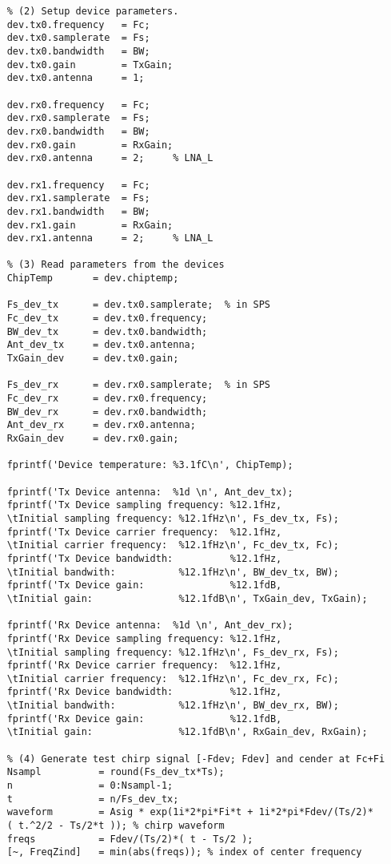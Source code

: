 \begin{verbatim}
    % (2) Setup device parameters. 
    dev.tx0.frequency   = Fc;   
    dev.tx0.samplerate  = Fs;   
    dev.tx0.bandwidth   = BW;
    dev.tx0.gain        = TxGain;
    dev.tx0.antenna     = 1;     
    
    dev.rx0.frequency   = Fc;
    dev.rx0.samplerate  = Fs;
    dev.rx0.bandwidth   = BW;
    dev.rx0.gain        = RxGain;
    dev.rx0.antenna     = 2;     % LNA_L
    
    dev.rx1.frequency   = Fc;
    dev.rx1.samplerate  = Fs;
    dev.rx1.bandwidth   = BW;
    dev.rx1.gain        = RxGain;
    dev.rx1.antenna     = 2;     % LNA_L
    
    % (3) Read parameters from the devices
    ChipTemp       = dev.chiptemp;
    
    Fs_dev_tx      = dev.tx0.samplerate;  % in SPS
    Fc_dev_tx      = dev.tx0.frequency;
    BW_dev_tx      = dev.tx0.bandwidth;
    Ant_dev_tx     = dev.tx0.antenna;
    TxGain_dev     = dev.tx0.gain;
    
    Fs_dev_rx      = dev.rx0.samplerate;  % in SPS
    Fc_dev_rx      = dev.rx0.frequency;
    BW_dev_rx      = dev.rx0.bandwidth;
    Ant_dev_rx     = dev.rx0.antenna;
    RxGain_dev     = dev.rx0.gain;
    
    fprintf('Device temperature: %3.1fC\n', ChipTemp);

    fprintf('Tx Device antenna:  %1d \n', Ant_dev_tx);
    fprintf('Tx Device sampling frequency: %12.1fHz, 
    \tInitial sampling frequency: %12.1fHz\n', Fs_dev_tx, Fs);
    fprintf('Tx Device carrier frequency:  %12.1fHz, 
    \tInitial carrier frequency:  %12.1fHz\n', Fc_dev_tx, Fc);
    fprintf('Tx Device bandwidth:          %12.1fHz, 
    \tInitial bandwith:           %12.1fHz\n', BW_dev_tx, BW);
    fprintf('Tx Device gain:               %12.1fdB, 
    \tInitial gain:               %12.1fdB\n', TxGain_dev, TxGain);
    
    fprintf('Rx Device antenna:  %1d \n', Ant_dev_rx);
    fprintf('Rx Device sampling frequency: %12.1fHz, 
    \tInitial sampling frequency: %12.1fHz\n', Fs_dev_rx, Fs);
    fprintf('Rx Device carrier frequency:  %12.1fHz, 
    \tInitial carrier frequency:  %12.1fHz\n', Fc_dev_rx, Fc);
    fprintf('Rx Device bandwidth:          %12.1fHz, 
    \tInitial bandwith:           %12.1fHz\n', BW_dev_rx, BW);
    fprintf('Rx Device gain:               %12.1fdB, 
    \tInitial gain:               %12.1fdB\n', RxGain_dev, RxGain);
    
    % (4) Generate test chirp signal [-Fdev; Fdev] and cender at Fc+Fi
    Nsampl          = round(Fs_dev_tx*Ts);
    n               = 0:Nsampl-1;
    t               = n/Fs_dev_tx;
    waveform        = Asig * exp(1i*2*pi*Fi*t + 1i*2*pi*Fdev/(Ts/2)*
    ( t.^2/2 - Ts/2*t )); % chirp waveform
    freqs           = Fdev/(Ts/2)*( t - Ts/2 );
    [~, FreqZind]   = min(abs(freqs)); % index of center frequency
    

\end{verbatim}
